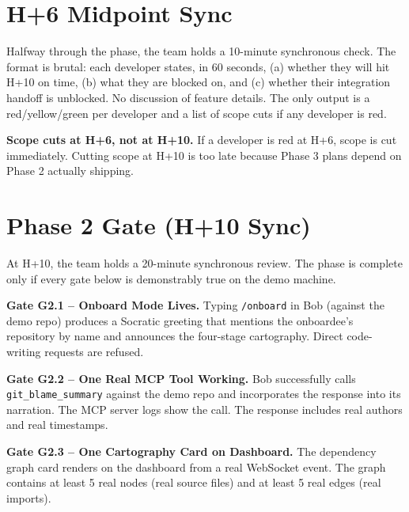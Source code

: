 \documentclass[11pt,letterpaper]{article}
\begin{document}
\section{H+6 Midpoint Sync}

Halfway through the phase, the team holds a 10-minute synchronous check. The format is brutal: each developer states, in 60 seconds, (a) whether they will hit H+10 on time, (b) what they are blocked on, and (c) whether their integration handoff is unblocked. No discussion of feature details. The only output is a red/yellow/green per developer and a list of scope cuts if any developer is red.

\begin{warning}
\textbf{Scope cuts at H+6, not at H+10.} If a developer is red at H+6, scope is cut immediately. Cutting scope at H+10 is too late because Phase 3 plans depend on Phase 2 actually shipping.
\end{warning}

\section{Phase 2 Gate (H+10 Sync)}

At H+10, the team holds a 20-minute synchronous review. The phase is complete only if every gate below is demonstrably true on the demo machine.

\begin{gate}
\textbf{Gate G2.1 -- Onboard Mode Lives.} Typing \texttt{/onboard} in Bob (against the demo repo) produces a Socratic greeting that mentions the onboardee's repository by name and announces the four-stage cartography. Direct code-writing requests are refused.
\end{gate}

\begin{gate}
\textbf{Gate G2.2 -- One Real MCP Tool Working.} Bob successfully calls \texttt{git\_blame\_summary} against the demo repo and incorporates the response into its narration. The MCP server logs show the call. The response includes real authors and real timestamps.
\end{gate}

\begin{gate}
\textbf{Gate G2.3 -- One Cartography Card on Dashboard.} The dependency graph card renders on the dashboard from a real WebSocket event. The graph contains at least 5 real nodes (real source files) and at least 5 real edges (real imports).
\end{gate}
\end{document}
